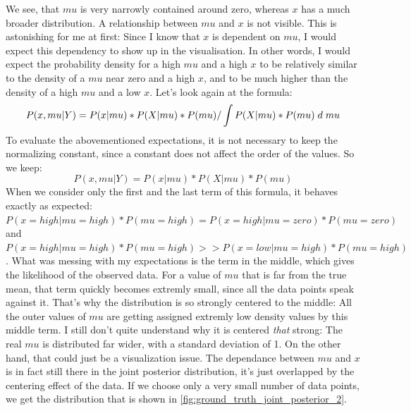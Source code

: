 \documentclass{article}
\begin{document}
We see, that $mu$ is very narrowly contained around zero, whereas $x$ has a much broader distribution. A relationship between $mu$ and $x$ is not visible. This is astonishing for me at first: Since I know that $x$ is dependent on $mu$, I would expect this dependency to show up in the visualisation. In other words, I would expect the probability density for a high $mu$ and a high $x$ to be relatively similar to the density of a $mu$ near zero and a high $x$, and to be much higher than the density of a high $mu$ and a low $x$.
Let's look again at the formula:
\begin{equation}
P(x,mu|Y) = P(x|mu) * P(X|mu) * P(mu) / \int P(X|mu) * P(mu) \hspace{1mm} d \hspace{1mm} mu
\end{equation}
To evaluate the abovementioned expectations, it is not necessary to keep the normalizing constant, since a constant does not affect the order of the values. So we keep:
\begin{equation}
P(x,mu|Y) = P(x|mu) * P(X|mu) * P(mu)
\end{equation}
When we consider only the first and the last term of this formula, it behaves exactly as expected: $P(x=high|mu=high)*P(mu=high) = P(x=high|mu=zero)*P(mu=zero)$
and $P(x=high|mu=high)*P(mu=high) >> P(x=low|mu=high)*P(mu=high)$. What was messing with my expectations is the term in the middle, which gives the likelihood of the observed data. For a value of $mu$ that is far from the true mean, that term quickly becomes extremly small, since all the data points speak against it. That's why the distribution is so strongly centered to the middle: All the outer values of $mu$ are getting assigned extremly low density values by this middle term. I still don't quite understand why it is centered \textit{that} strong: The real $mu$ is distributed far wider, with a standard deviation of 1. On the other hand, that could just be a visualization issue.
The dependance between $mu$ and $x$ is in fact still there in the joint posterior distribution, it's just overlapped by the centering effect of the data. If we choose only a very small number of data points, we get the distribution that is shown in \ref{fig:ground_truth_joint_posterior_2}.
\end{document}
